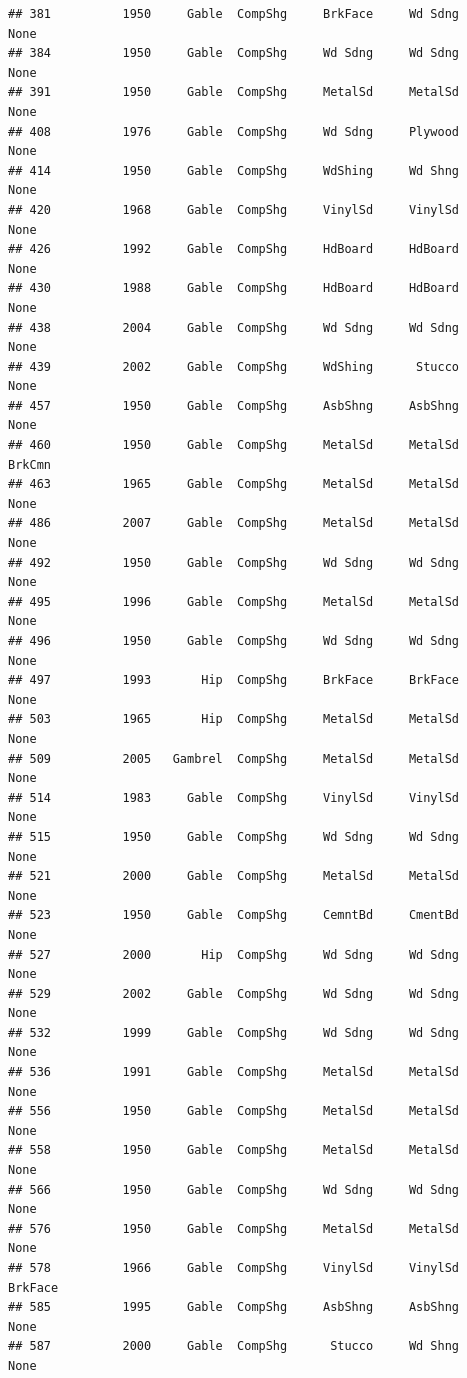 \documentclass[]{article}
\begin{document}
\begin{verbatim}
## 381          1950     Gable  CompShg     BrkFace     Wd Sdng       None
## 384          1950     Gable  CompShg     Wd Sdng     Wd Sdng       None
## 391          1950     Gable  CompShg     MetalSd     MetalSd       None
## 408          1976     Gable  CompShg     Wd Sdng     Plywood       None
## 414          1950     Gable  CompShg     WdShing     Wd Shng       None
## 420          1968     Gable  CompShg     VinylSd     VinylSd       None
## 426          1992     Gable  CompShg     HdBoard     HdBoard       None
## 430          1988     Gable  CompShg     HdBoard     HdBoard       None
## 438          2004     Gable  CompShg     Wd Sdng     Wd Sdng       None
## 439          2002     Gable  CompShg     WdShing      Stucco       None
## 457          1950     Gable  CompShg     AsbShng     AsbShng       None
## 460          1950     Gable  CompShg     MetalSd     MetalSd     BrkCmn
## 463          1965     Gable  CompShg     MetalSd     MetalSd       None
## 486          2007     Gable  CompShg     MetalSd     MetalSd       None
## 492          1950     Gable  CompShg     Wd Sdng     Wd Sdng       None
## 495          1996     Gable  CompShg     MetalSd     MetalSd       None
## 496          1950     Gable  CompShg     Wd Sdng     Wd Sdng       None
## 497          1993       Hip  CompShg     BrkFace     BrkFace       None
## 503          1965       Hip  CompShg     MetalSd     MetalSd       None
## 509          2005   Gambrel  CompShg     MetalSd     MetalSd       None
## 514          1983     Gable  CompShg     VinylSd     VinylSd       None
## 515          1950     Gable  CompShg     Wd Sdng     Wd Sdng       None
## 521          2000     Gable  CompShg     MetalSd     MetalSd       None
## 523          1950     Gable  CompShg     CemntBd     CmentBd       None
## 527          2000       Hip  CompShg     Wd Sdng     Wd Sdng       None
## 529          2002     Gable  CompShg     Wd Sdng     Wd Sdng       None
## 532          1999     Gable  CompShg     Wd Sdng     Wd Sdng       None
## 536          1991     Gable  CompShg     MetalSd     MetalSd       None
## 556          1950     Gable  CompShg     MetalSd     MetalSd       None
## 558          1950     Gable  CompShg     MetalSd     MetalSd       None
## 566          1950     Gable  CompShg     Wd Sdng     Wd Sdng       None
## 576          1950     Gable  CompShg     MetalSd     MetalSd       None
## 578          1966     Gable  CompShg     VinylSd     VinylSd    BrkFace
## 585          1995     Gable  CompShg     AsbShng     AsbShng       None
## 587          2000     Gable  CompShg      Stucco     Wd Shng       None

\end{verbatim}
\end{document}
